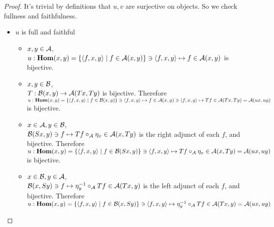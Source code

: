 \documentclass[12pt]{article}
\theoremstyle{plain}
\theoremstyle{definition}
\begin{document}
\begin{proof} It's trivial by definitions that $u,v$ are surjective on objects. So we check fullness and faithfulness.
\begin{itemize}
 \item $u$ is full and faithful
 \begin{itemize}
 \item $x,y \in {\cal A}$, \\
 $u:{\bf Hom}(x,y)=\{ \langle f,x,y \rangle \mid f \in {\cal A}(x,y) \} \ni \langle f,x,y \rangle \mapsto f \in {\cal A}(x,y)$ is bijective.
 \item $x,y \in {\cal B}$, \\
 $T:{\cal B}{\rm (}x,y{\rm )} \rightarrow {\cal A}{\rm (}Tx,Ty{\rm )}$ is bijective. Therefore $u: {\bf Hom}{\rm (}x,y{\rm )}=\{ \langle f,x,y \rangle \mid f \in {\cal B}(x,y) \} \ni \langle f,x,y \rangle \mapsto f \in {\cal A}(x,y) \ni \langle f,x,y \rangle \mapsto Tf \in {\cal A}{\rm (}Tx,Ty{\rm )}={\cal A}{\rm (}ux,uy{\rm )}$ is bijective.
 \item $x \in {\cal A}, y \in {\cal B}$, \\
${\cal B}{\rm (}Sx,y{\rm )} \ni f \mapsto Tf \circ_{{\cal A}} \eta_{x} \in {\cal A}{\rm (}x,Ty{\rm )} $ is the right adjunct of each $f$, and bijective. Therefore $u: {\bf Hom}{\rm (}x,y{\rm )}=\{ \langle f,x,y \rangle \mid f \in {\cal B}(Sx,y) \} \ni \langle f,x,y \rangle \mapsto Tf \circ_{{\cal A}} \eta_{x} \in {\cal A}{\rm (}x,Ty{\rm )}={\cal A}{\rm (}ux,uy{\rm )}$ is bijective.
 \item $x \in {\cal B} , y \in {\cal A}$, \\
${\cal B}{\rm (}x,Sy{\rm )} \ni f \mapsto \eta_{y}^{-1} \circ_{{\cal A}} Tf \in {\cal A}{\rm (}Tx,y{\rm )}$ is the left adjunct of each $f$, and bijective. Therefore $u: {\bf Hom}{\rm (}x,y{\rm )}=\{ \langle f,x,y \rangle \mid f \in {\cal B}(x,Sy) \} \ni \langle f,x,y \rangle \mapsto \eta_{y}^{-1} \circ_{{\cal A}} Tf \in {\cal A}{\rm (}Tx,y{\rm )}={\cal A}{\rm (}ux,uy{\rm )}$
 \end{itemize}
 

\end{itemize}
\end{proof}
\end{document}
